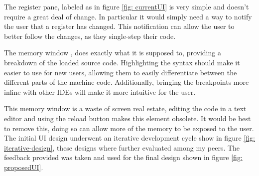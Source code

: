 The register pane, labeled as  in figure \ref{fig: currentUI} is very simple and doesn't require a great deal of change. In particular it would simply need a way to notify the user that a register has changed. This notification can allow the user to better follow the changes, as they single-step their code.

The memory window , does exactly what it is supposed to, providing a breakdown of the loaded source code. Highlighting the syntax should make it easier to use for new users, allowing them to easily differentiate between the different parts of the machine code. Additionally, bringing the breakpoints more inline with other IDEs will make it more intuitive for the user.

This memory window is a waste of screen real estate, editing the code in a text editor and using the reload button makes this element obsolete. It would be best to remove this, doing so can allow more of the memory to be exposed to the user.
The initial UI design underwent an iterative development cycle show in figure \ref{fig: iterative-design}, these designs where further evaluated among my peers. The feedback provided was taken and used for the final design shown in figure \ref{fig: proposedUI}.
